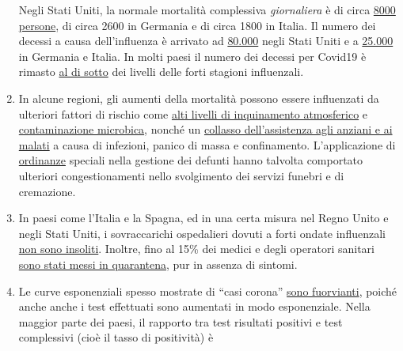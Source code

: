 \begin{enumerate}
  Negli Stati Uniti, la normale mortalità complessiva \emph{giornaliera}
  è di circa
  \href{https://www.cdc.gov/mmwr/volumes/68/wr/mm6826a5.htm}{8000
  persone}, di circa 2600 in Germania e di circa 1800 in Italia. Il
  numero dei decessi a causa dell'influenza è arrivato ad
  \href{https://www.statnews.com/2018/09/26/cdc-us-flu-deaths-winter/}{80.000}
  negli Stati Uniti e a
  \href{https://www.sciencedirect.com/science/article/pii/S1201971219303285}{25.000}
  in Germania e Italia. In molti paesi il numero dei decessi per Covid19
  è rimasto \href{https://www.euromomo.eu/graphs-and-maps/}{al di sotto}
  dei livelli delle forti stagioni influenzali.
\item
  In alcune regioni, gli aumenti della mortalità possono essere
  influenzati da ulteriori fattori di rischio come
  \href{https://www.theguardian.com/environment/2020/apr/20/air-pollution-may-be-key-contributor-to-covid-19-deaths-study?utm_medium}{alti
  livelli di inquinamento atmosferico} e
  \href{https://www.ansa.it/english/news/science_tecnology/2019/11/19/italy-top-in-eu-in-antibiotic-resistance_369e0123-0107-445e-8c17-f11932c9d27c.html}{contaminazione
  microbica}, nonché un
  \href{https://swprs.org/covid-19-a-report-from-italy/}{collasso
  dell'assistenza agli anziani e ai malati} a causa di infezioni, panico
  di massa e confinamento. L'applicazione di
  \href{https://www.ecdc.europa.eu/sites/default/files/documents/COVID-19-safe-handling-of-bodies-or-persons-dying-from-COVID19.pdf}{ordinanze}
  speciali nella gestione dei defunti hanno talvolta comportato
  ulteriori congestionamenti nello svolgimento dei servizi funebri e di
  cremazione.
\item
  In paesi come l'Italia e la Spagna, ed in una certa misura nel Regno
  Unito e negli Stati Uniti, i sovraccarichi ospedalieri dovuti a forti
  ondate influenzali
  \href{https://off-guardian.org/2020/04/02/coronavirus-fact-check-1-flu-doesnt-overwhelm-our-hospitals/}{non
  sono insoliti}. Inoltre, fino al 15\% dei medici e degli operatori
  sanitari
  \href{https://www.reuters.com/article/us-health-coronavirus-spain-morgue-idUSKBN21B1PP}{sono
  stati messi in quarantena}, pur in assenza di sintomi.
\item
  Le curve esponenziali spesso mostrate di ``casi corona''
  \href{https://fivethirtyeight.com/features/coronavirus-case-counts-are-meaningless/}{sono
  fuorvianti}, poiché anche anche i test effettuati sono aumentati in
  modo esponenziale. Nella maggior parte dei paesi, il rapporto tra test
  risultati positivi e test complessivi (cioè il tasso di positività) è

\end{enumerate}
